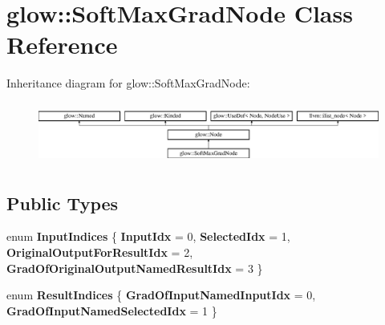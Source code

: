 \hypertarget{classglow_1_1_soft_max_grad_node}{}\section{glow\+:\+:Soft\+Max\+Grad\+Node Class Reference}
\label{classglow_1_1_soft_max_grad_node}
Inheritance diagram for glow\+:\+:Soft\+Max\+Grad\+Node\+:\begin{figure}[H]
\begin{center}
\leavevmode
\includegraphics[height=2.028986cm]{classglow_1_1_soft_max_grad_node}
\end{center}
\end{figure}
\subsection*{Public Types}
\begin{DoxyCompactItemize}
\item 
\mbox{\label{classglow_1_1_soft_max_grad_node_a0d958d80b523ac8530d71824153feafd}} 
enum {\bfseries Input\+Indices} \{ {\bfseries Input\+Idx} = 0, 
{\bfseries Selected\+Idx} = 1, 
{\bfseries Original\+Output\+For\+Result\+Idx} = 2, 
{\bfseries Grad\+Of\+Original\+Output\+Named\+Result\+Idx} = 3
 \}
\item 
\mbox{\label{classglow_1_1_soft_max_grad_node_a5aac0117e10812e3187c1ed0e13c421f}} 
enum {\bfseries Result\+Indices} \{ {\bfseries Grad\+Of\+Input\+Named\+Input\+Idx} = 0, 
{\bfseries Grad\+Of\+Input\+Named\+Selected\+Idx} = 1
 \}
\end{DoxyCompactItemize}
